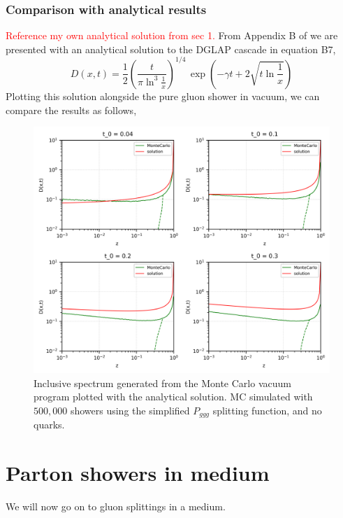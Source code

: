 \documentclass[main.tex]{subfiles}
\begin{document}
\subsubsection{Comparison with analytical results}
\textcolor{red}{Reference my own analytical solution from sec 1.}
From Appendix B of \cite{Energy_flow_medium_cascade_2016} we are presented with an analytical solution to the DGLAP cascade in equation B7, 
\begin{equation}\label{DGLAP_solution_energyflowmedium}
    D(x,t) = \frac{1}{2} \left( \frac{t}{\pi \ln^3\frac{1}{x}}\right)^{1/4} \, \exp \left(-\gamma t +2 \sqrt{t \ln\frac{1}{x}}\right) 
\end{equation}
Plotting this solution alongside the pure gluon shower in vacuum, we can compare the results as follows, 
\begin{figure}[ht]
    \centering
    \includegraphics[width=12cm]{pictures/distributions/vacuum_shower_simple_ggg_500k_minz0_MCandAnalytical.png}
    \caption{Inclusive spectrum generated from the Monte Carlo vacuum program plotted with the analytical solution. MC simulated with \(500,000\) showers using the simplified \(P_{ggg}\) splitting function, and no quarks.}
    \label{fig: vacuum_MCandAnalytical_comparison}
\end{figure}

\newpage
\section{Parton showers in medium}
We will now go on to gluon splittings in a medium. 
\end{document}
